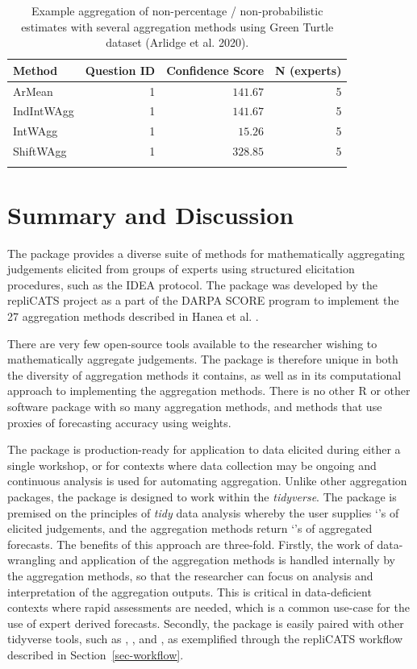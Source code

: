 \documentclass[article]{jss}
\newcommand{\class}[1]{`\code{#1}'}
\begin{document}
\hypertarget{tbl-BYO-data-aggregate}{}
\begin{longtable}{lrrr}

\toprule
Method & Question ID & Confidence Score & N (experts) \\ 
\midrule
ArMean & 1 & $141.67$ & 5 \\ 
IndIntWAgg & 1 & $141.67$ & 5 \\ 
IntWAgg & 1 & $15.26$ & 5 \\ 
ShiftWAgg & 1 & $328.85$ & 5 \\ 
\bottomrule
\caption{\label{tbl-BYO-data-aggregate}Example aggregation of non-percentage / non-probabilistic estimates with
several aggregation methods using Green Turtle dataset (Arlidge et al.
2020). }\tabularnewline
\end{longtable}

\hypertarget{sec-summary}{%
\section{Summary and Discussion}\label{sec-summary}}

The  package provides a diverse suite of methods for
mathematically aggregating judgements elicited from groups of experts
using structured elicitation procedures, such as the IDEA protocol. The
 package was developed by the repliCATS project as a part
of the DARPA SCORE program to implement the 27 aggregation methods
described in Hanea et al. \citeyearpar{Hanea2021}.

There are very few open-source tools available to the researcher wishing
to mathematically aggregate judgements. The  package is
therefore unique in both the diversity of aggregation methods it
contains, as well as in its computational approach to implementing the
aggregation methods. There is no other R or other software package with
so many aggregation methods, and methods that use proxies of forecasting
accuracy using weights.

The  package is production-ready for application to data
elicited during either a single workshop, or for contexts where data
collection may be ongoing and continuous analysis is used for automating
aggregation. Unlike other aggregation packages, the 
package is designed to work within the \emph{tidyverse}. The package is
premised on the principles of \emph{tidy} data analysis whereby the user
supplies \class{data.frame}s of elicited judgements, and the aggregation
methods return \class{data.frame}s of aggregated forecasts. The benefits
of this approach are three-fold. Firstly, the work of data-wrangling and
application of the aggregation methods is handled internally by the
aggregation methods, so that the researcher can focus on analysis and
interpretation of the aggregation outputs. This is critical in
data-deficient contexts where rapid assessments are needed, which is a
common use-case for the use of expert derived forecasts. Secondly, the
 package is easily paired with other tidyverse tools, such
as , , and , as exemplified through
the repliCATS workflow described in Section~\ref{sec-workflow}.
\end{document}
